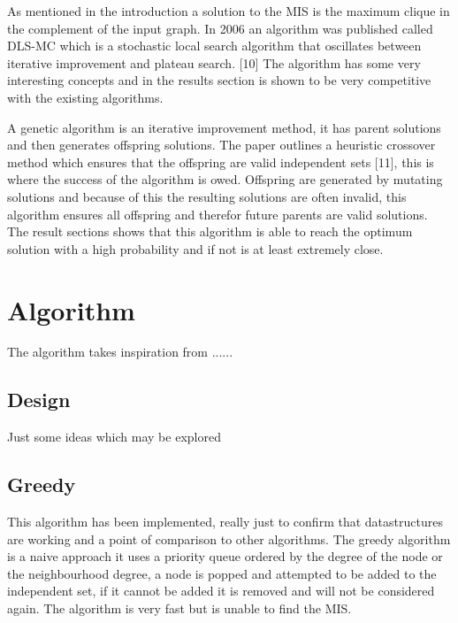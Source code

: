 \documentclass[conference]{IEEEtran}
\begin{document}
As mentioned in the introduction a solution to the MIS is the maximum clique in the complement of the input graph. In
2006 an algorithm was published called DLS-MC which is a stochastic local search algorithm that oscillates between
iterative improvement and plateau search. [10] The algorithm has some very interesting concepts and in the results 
section is shown to be very competitive with the existing algorithms.

A genetic algorithm is an iterative improvement method, it has parent solutions and then generates offspring solutions.
The paper outlines a heuristic crossover method which ensures that the offspring are valid independent sets [11], this
is where the success of the algorithm is owed. Offspring are generated by mutating solutions and because of this the
resulting solutions are often invalid, this algorithm ensures all offspring and therefor future parents are valid 
solutions. The result sections shows that this algorithm is able to reach the optimum solution with a high probability
and if not is at least extremely close.


\section{Algorithm}

The algorithm takes inspiration from ......

\subsection{Design}

Just some ideas which may be explored

\subsection{Greedy}

This algorithm has been implemented, really just to confirm that datastructures are working and a point of comparison 
to other algorithms. The greedy algorithm is a naive approach it uses a priority queue ordered by the degree of the node 
or the neighbourhood degree, a node is popped and attempted to be added to the independent set, if it cannot be added it 
is removed and will not be considered again. The algorithm is very fast but is unable to find the MIS.

\end{document}
